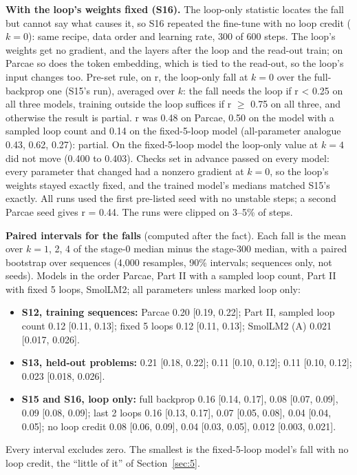 \documentclass[10pt]{article}
\begin{document}
\textbf{With the loop's weights fixed (S16).} The loop-only statistic locates the fall but cannot say what causes it, so S16 repeated the fine-tune with no loop credit ($k = 0$): same recipe, data order and learning rate, 300 of 600 steps. The loop's weights get no gradient, and the layers after the loop and the read-out train; on Parcae so does the token embedding, which is tied to the read-out, so the loop's input changes too. Pre-set rule, on r, the loop-only fall at $k = 0$ over the full-backprop one (S15's run), averaged over $k$: the fall needs the loop if r < 0.25 on all three models, training outside the loop suffices if r $\geq$ 0.75 on all three, and otherwise the result is partial. r was 0.48 on Parcae, 0.50 on the model with a sampled loop count and 0.14 on the fixed-5-loop model (all-parameter analogue 0.43, 0.62, 0.27): partial. On the fixed-5-loop model the loop-only value at $k = 4$ did not move (0.400 to 0.403). Checks set in advance passed on every model: every parameter that changed had a nonzero gradient at $k = 0$, so the loop's weights stayed exactly fixed, and the trained model's medians matched S15's exactly. All runs used the first pre-listed seed with no unstable steps; a second Parcae seed gives r = 0.44. The runs were clipped on 3--5\% of steps.

\textbf{Paired intervals for the falls} (computed after the fact). Each fall is the mean over $k = 1$, 2, 4 of the stage-0 median minus the stage-300 median, with a paired bootstrap over sequences (4,000 resamples, 90\% intervals; sequences only, not seeds). Models in the order Parcae, Part II with a sampled loop count, Part II with fixed 5 loops, SmolLM2; all parameters unless marked loop only:

\begin{itemize}
\item \textbf{S12, training sequences:} Parcae 0.20 [0.19, 0.22]; Part II, sampled loop count 0.12 [0.11, 0.13]; fixed 5 loops 0.12 [0.11, 0.13]; SmolLM2 (A) 0.021 [0.017, 0.026].
\item \textbf{S13, held-out problems:} 0.21 [0.18, 0.22]; 0.11 [0.10, 0.12]; 0.11 [0.10, 0.12]; 0.023 [0.018, 0.026].
\item \textbf{S15 and S16, loop only:} full backprop 0.16 [0.14, 0.17], 0.08 [0.07, 0.09], 0.09 [0.08, 0.09]; last 2 loops 0.16 [0.13, 0.17], 0.07 [0.05, 0.08], 0.04 [0.04, 0.05]; no loop credit 0.08 [0.06, 0.09], 0.04 [0.03, 0.05], 0.012 [0.003, 0.021].
\end{itemize}

Every interval excludes zero. The smallest is the fixed-5-loop model's fall with no loop credit, the ``little of it'' of Section~\ref{sec:5}.
\end{document}
